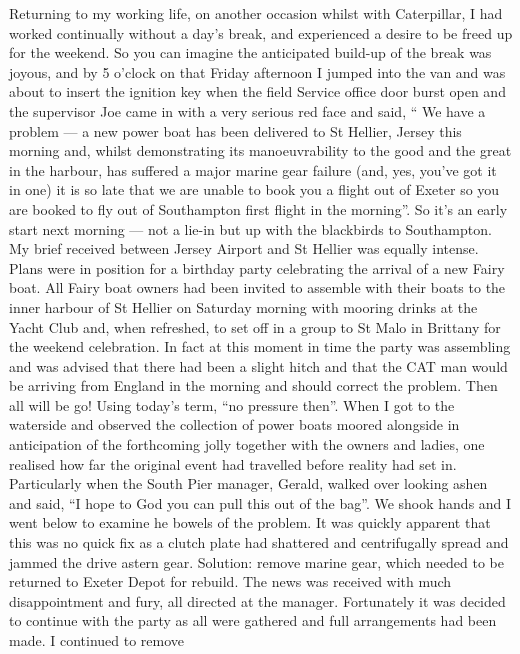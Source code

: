 
Returning to my working life, on another occasion whilst with Caterpillar, I had
worked continually without a day's break, and experienced a desire to be freed
up for the weekend. So you can imagine the anticipated build-up of the break
was joyous, and by 5 o'clock on that Friday afternoon I jumped into the van and
was about to insert the ignition key when the field Service office door burst
open and the supervisor Joe came in with a very serious red face and said, ``
We have a problem --- a new power boat has been delivered to St Hellier, Jersey
this morning and, whilst demonstrating its manoeuvrability to the good and the
great in the harbour, has suffered a major marine gear failure (and, yes,
you've got it in one) it is so late that we are unable to book you a flight out
of Exeter so you are booked to fly out of Southampton first flight in the
morning''. So it's an early start next morning --- not a lie-in but up with the
blackbirds to Southampton. My brief received between Jersey Airport and St
Hellier was equally intense. Plans were in position for a birthday party
celebrating the arrival of a new Fairy boat. All Fairy boat owners had been
invited to assemble with their boats to the inner harbour of St Hellier on
Saturday morning with mooring drinks at the Yacht Club and, when refreshed, to
set off in a group to St Malo in Brittany for the weekend celebration. In fact
at this moment in time the party was assembling and was advised that there had
been a slight hitch and that the CAT man would be arriving from England in the
morning and should correct the problem. Then all will be go! Using today's
term, ``no pressure then''. When I got to the waterside and observed the
collection of power boats moored alongside in anticipation of the forthcoming
jolly together with the owners and ladies, one realised how far the original
event had travelled before reality had set in. Particularly when the South Pier
manager, Gerald, walked over looking ashen and said, ``I hope to God you can
pull this out of the bag''. We shook hands and I went below to examine he
bowels of the problem. It was quickly apparent that this was no quick fix as a
clutch plate had shattered and centrifugally spread and jammed the drive astern
gear. Solution: remove marine gear, which needed to be returned to Exeter Depot
for rebuild. The news was received with much disappointment and fury, all
directed at the manager. Fortunately it was decided to continue with the party
as all were gathered and full arrangements had been made. I continued to remove
